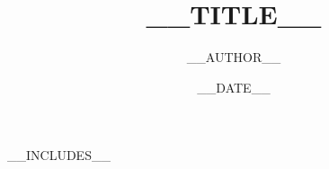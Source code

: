 \documentclass[11pt]{report}
\title{__TITLE__}
\author{__AUTHOR__}
\date{__DATE__}
\begin{document}
\maketitle
\tableofcontents

__INCLUDES__



\end{document}
